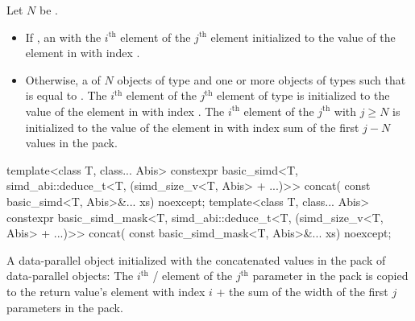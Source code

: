   \begin{itemdescr}

    \pnum Let $N$ be .

    \pnum\returns
    \begin{itemize}
      \item If , an  with
        the $i^\text{th}$ \simd element of the $j^\text{th}$ 
        element initialized to the value of the element in  with index
        .

      \item Otherwise, a  of $N$ objects of type  and one
        or more objects of types  such that
         is equal to .
        The $i^\text{th}$  element of the $j^\text{th}$ 
        element of type  is initialized to the value of the element in
         with index .
        The $i^\text{th}$  element of the $j^\text{th}$ 
        with $j \ge N$ is initialized to the value of the element in 
        with index  sum of the first $j - N$
        values in the  pack.
    \end{itemize}
  \end{itemdescr}

\begin{itemdecl}
template<class T, class... Abis>
  constexpr basic_simd<T, simd_abi::deduce_t<T, (simd_size_v<T, Abis> + ...)>> concat(
    const basic_simd<T, Abis>&... xs) noexcept;
template<class T, class... Abis>
  constexpr basic_simd_mask<T, simd_abi::deduce_t<T, (simd_size_v<T, Abis> + ...)>> concat(
    const basic_simd_mask<T, Abis>&... xs) noexcept;
\end{itemdecl}

\begin{itemdescr}
  \pnum\returns
  A data-parallel object initialized with the concatenated values in the  pack of data-parallel objects: The $i^\text{th}$ / element of the $j^\text{th}$ parameter in the  pack is copied to the return value's element with index $i$ + the sum of the width of the first $j$ parameters in the  pack.
\end{itemdescr}

